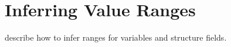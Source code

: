 \section{Inferring Value Ranges}
\label{s:range}

describe how to infer ranges for variables and structure fields.
